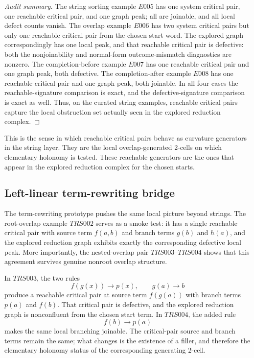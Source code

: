 \documentclass[11pt]{article}
\numberwithin{equation}{section}
\theoremstyle{definition}
\theoremstyle{remark}
\begin{document}
\begin{proof}[Audit summary]
The string sorting example $E005$ has one system critical pair, one reachable critical pair, and one graph peak; all are joinable, and all local defect counts vanish. The overlap example $E006$ has two system critical pairs but only one reachable critical pair from the chosen start word. The explored graph correspondingly has one local peak, and that reachable critical pair is defective: both the nonjoinability and normal-form outcome-mismatch diagnostics are nonzero. The completion-before example $E007$ has one reachable critical pair and one graph peak, both defective. The completion-after example $E008$ has one reachable critical pair and one graph peak, both joinable. In all four cases the reachable-signature comparison is exact, and the defective-signature comparison is exact as well. Thus, on the curated string examples, reachable critical pairs capture the local obstruction set actually seen in the explored reduction complex.
\end{proof}

This is the sense in which reachable critical pairs behave as curvature generators in the string layer. They are the local overlap-generated $2$-cells on which elementary holonomy is tested. These reachable generators are the ones that appear in the explored reduction complex for the chosen starts.

\subsection{Left-linear term-rewriting bridge}
\label{subsec:left-linear-trs-bridge}

The term-rewriting prototype pushes the same local picture beyond strings. The root-overlap example $TRS002$ serves as a smoke test: it has a single reachable critical pair with source term $f(a,b)$ and branch terms $g(b)$ and $h(a)$, and the explored reduction graph exhibits exactly the corresponding defective local peak. More importantly, the nested-overlap pair $TRS003$--$TRS004$ shows that this agreement survives genuine nonroot overlap structure.

In $TRS003$, the two rules
\[
f(g(x)) \to p(x),
\qquad
g(a) \to b
\]
produce a reachable critical pair at source term $f(g(a))$ with branch terms $p(a)$ and $f(b)$. That critical pair is defective, and the explored reduction graph is nonconfluent from the chosen start term. In $TRS004$, the added rule
\[
f(b) \to p(a)
\]
makes the same local branching joinable. The critical-pair source and branch terms remain the same; what changes is the existence of a filler, and therefore the elementary holonomy status of the corresponding generating $2$-cell.
\end{document}
